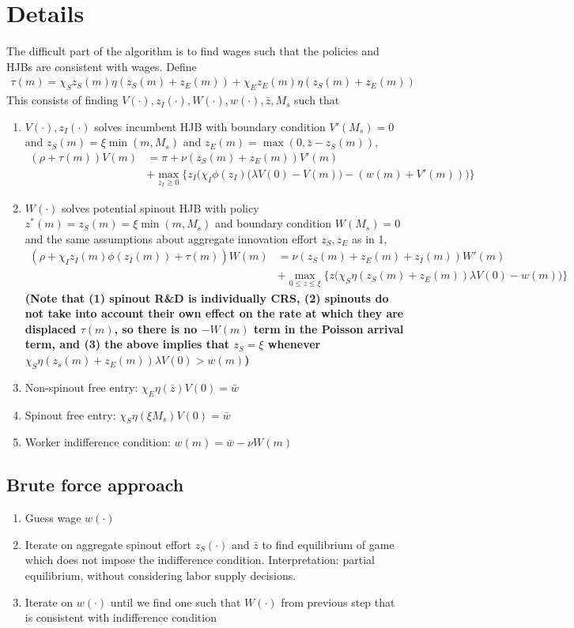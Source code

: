 \documentclass[12pt,english]{article}
\theoremstyle{remark}
\begin{document}
\section{Details}
The difficult part of the algorithm is to find wages such that the policies and HJBs are consistent with wages. Define
\begin{align*}
\tau(m) = \chi_Sz_S(m)\eta(z_S(m) + z_E(m)) + \chi_Ez_E(m)\eta(z_S(m) + z_E(m))
\end{align*}
This consists of finding $V(\cdot),z_I(\cdot),W(\cdot),w(\cdot),\bar{z},M_s$ such that
\begin{enumerate}
	\item $V(\cdot),z_I(\cdot)$ solves incumbent HJB with boundary condition $V'(M_s) = 0$ and $z_S(m) = \xi \min(m,M_s)$ and $z_E(m) = \max(0,\bar{z}-z_S(m))$, 
	\begin{align*}
	(\rho + \tau(m)) V(m) &= \pi + \nu (z_S(m) + z_E(m)) V'(m) \\
	&+ \max_{z_I \ge 0} \Big\{ z_I \Big( \chi_I \phi(z_I) \Big(\lambda V(0) - V(m) \Big) - (w(m) + V'(m)) \Big) \Big\}
	\end{align*}
	\item $W(\cdot)$ solves potential spinout HJB with policy $z^*(m) = z_S(m) = \xi \min(m,M_s)$ and boundary condition $W(M_s) = 0$ and the same assumptions about aggregate innovation effort $z_S,z_E$ as in 1,
	\begin{align*}
	(\rho + \chi_I z_I(m) \phi (z_I(m)) + \tau(m)) W(m) &= \nu (z_S(m) + z_E(m) + z_I(m) )W'(m) \\
	&+ \max_{0 \le z \le \xi} \Big\{ z \Big(\chi_S \eta(z_S(m) + z_E(m)) \lambda V(0) - w(m) \Big)  \Big\}
	\end{align*}
	\textbf{(Note that (1) spinout R\&D is individually CRS, (2) spinouts do not take into account their own effect on the rate at which they are displaced $\tau(m)$, so there is no $-W(m)$ term in the Poisson arrival term, and (3) the above implies that $z_S = \xi$ whenever $\chi_S \eta(z_s(m) + z_E(m))\lambda V(0) > w(m)$)}
	\item Non-spinout free entry: $\chi_E \eta(\bar{z}) V(0) = \bar{w}$
	\item Spinout free entry: $\chi_S \eta(\xi M_s) V(0) = \bar{w}$
	\item Worker indifference condition: $w(m) = \bar{w} - \nu W(m)$
\end{enumerate}

\subsection{Brute force approach}
\begin{enumerate}
	\item Guess wage $w(\cdot)$
	\item Iterate on aggregate spinout effort $z_S(\cdot)$ and $\bar{z}$ to find equilibrium of game which does not impose the indifference condition. Interpretation: partial equilibrium, without considering labor supply decisions. 
	\item Iterate on $w(\cdot)$ until we find one such that $W(\cdot)$ from previous step that is consistent with indifference condition
\end{enumerate}
\end{document}
